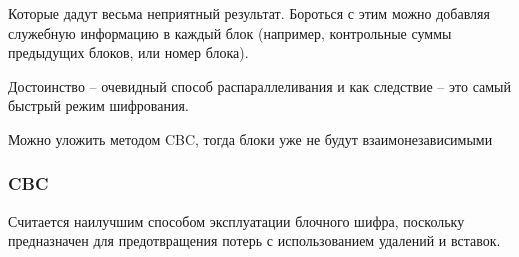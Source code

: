Которые дадут весьма неприятный результат. Бороться с этим можно добавляя служебную информацию в каждый блок (например, контрольные суммы предыдущих блоков, или номер блока).

Достоинство – очевидный способ распараллеливания и как следствие – это самый быстрый режим шифрования.

Можно уложить методом CBC, тогда блоки уже не будут взаимонезависимыми

\begin{frame}
    \frametitle{CBC}
    
    \begin{figure}
        \begin{center}
        \end{center}
    \end{figure} 
\end{frame}

Считается наилучшим способом эксплуатации блочного шифра, поскольку предназначен для предотвращения потерь с использованием удалений и вставок.

